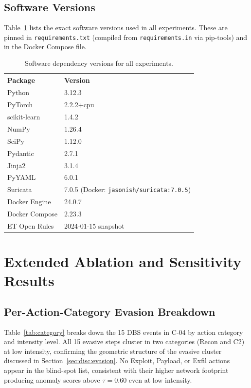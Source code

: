 \documentclass[sigconf]{acmart}
\begin{document}
\subsection{Software Versions}
\label{app:versions}

Table~\ref{tab:versions} lists the exact software versions used in all
experiments. These are pinned in \texttt{requirements.txt} (compiled from
\texttt{requirements.in} via pip-tools) and in the Docker Compose file.

\begin{table}[H]
\caption{Software dependency versions for all experiments.}
\label{tab:versions}
\centering
\small
\begin{tabular}{l l}
\toprule
Package & Version \\
\midrule
Python         & 3.12.3 \\
PyTorch        & 2.2.2+cpu \\
scikit-learn   & 1.4.2 \\
NumPy          & 1.26.4 \\
SciPy          & 1.12.0 \\
Pydantic       & 2.7.1 \\
Jinja2         & 3.1.4 \\
PyYAML         & 6.0.1 \\
Suricata       & 7.0.5 (Docker: \texttt{jasonish/suricata:7.0.5}) \\
Docker Engine  & 24.0.7 \\
Docker Compose & 2.23.3 \\
ET Open Rules  & 2024-01-15 snapshot \\
\bottomrule
\end{tabular}
\end{table}

\section{Extended Ablation and Sensitivity Results}
\label{app:extended}

\subsection{Per-Action-Category Evasion Breakdown}
\label{app:category}

Table~\ref{tab:category} breaks down the 15 DBS events in C-04 by
action category and intensity level. All 15 evasive steps cluster in two
categories (Recon and C2) at low intensity, confirming the geometric
structure of the evasive cluster discussed in Section~\ref{sec:disc:evasion}.
No Exploit, Payload, or Exfil actions appear in the blind-spot list,
consistent with their higher network footprint producing anomaly scores
above $\tau = 0.60$ even at low intensity.
\end{document}
